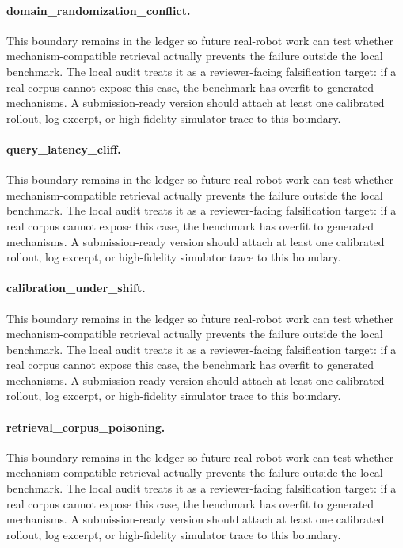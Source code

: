 \documentclass{article}
\begin{document}
\paragraph{domain\_randomization\_conflict.} This boundary remains in the ledger so future real-robot work can test whether mechanism-compatible retrieval actually prevents the failure outside the local benchmark. The local audit treats it as a reviewer-facing falsification target: if a real corpus cannot expose this case, the benchmark has overfit to generated mechanisms. A submission-ready version should attach at least one calibrated rollout, log excerpt, or high-fidelity simulator trace to this boundary.
\paragraph{query\_latency\_cliff.} This boundary remains in the ledger so future real-robot work can test whether mechanism-compatible retrieval actually prevents the failure outside the local benchmark. The local audit treats it as a reviewer-facing falsification target: if a real corpus cannot expose this case, the benchmark has overfit to generated mechanisms. A submission-ready version should attach at least one calibrated rollout, log excerpt, or high-fidelity simulator trace to this boundary.
\paragraph{calibration\_under\_shift.} This boundary remains in the ledger so future real-robot work can test whether mechanism-compatible retrieval actually prevents the failure outside the local benchmark. The local audit treats it as a reviewer-facing falsification target: if a real corpus cannot expose this case, the benchmark has overfit to generated mechanisms. A submission-ready version should attach at least one calibrated rollout, log excerpt, or high-fidelity simulator trace to this boundary.
\paragraph{retrieval\_corpus\_poisoning.} This boundary remains in the ledger so future real-robot work can test whether mechanism-compatible retrieval actually prevents the failure outside the local benchmark. The local audit treats it as a reviewer-facing falsification target: if a real corpus cannot expose this case, the benchmark has overfit to generated mechanisms. A submission-ready version should attach at least one calibrated rollout, log excerpt, or high-fidelity simulator trace to this boundary.
\end{document}
